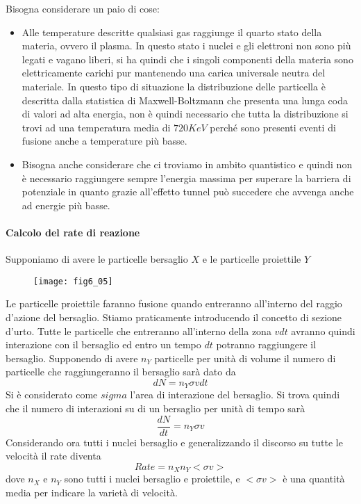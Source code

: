 Bisogna considerare un paio di cose:
\begin{itemize}
\item Alle temperature descritte qualsiasi gas raggiunge il quarto stato della materia, ovvero il plasma.
In questo stato i nuclei e gli elettroni non sono più legati e vagano liberi, si ha quindi che i singoli componenti della materia sono elettricamente carichi pur mantenendo una carica universale neutra del materiale.
In questo tipo di situazione la  distribuzione delle particella è descritta dalla statistica di Maxwell-Boltzmann che presenta una lunga coda di valori ad alta energia, non è quindi necessario che tutta la distribuzione si trovi ad una temperatura media di $720KeV$ perché sono presenti eventi di fusione anche a temperature più basse.
\item Bisogna anche considerare che ci troviamo in ambito quantistico e quindi non è necessario raggiungere sempre l'energia massima per superare la barriera di potenziale in quanto grazie all'effetto tunnel può succedere che avvenga anche ad energie più basse.
\end{itemize}

\paragraph{Calcolo del rate di reazione}
Supponiamo di avere le particelle bersaglio $X$ e le particelle proiettile $Y$
\begin{figure}[h]
\centering
\texttt{[image: fig6\_05]}
\end{figure}

Le particelle proiettile faranno fusione quando entreranno all'interno del raggio d'azione del bersaglio.
Stiamo praticamente introducendo il concetto di  sezione d'urto.
Tutte le particelle che entreranno all'interno della zona $vdt$ avranno quindi interazione con il bersaglio ed entro un tempo $dt$ potranno raggiungere il bersaglio.
Supponendo di avere $n_Y$ particelle per unità di volume il numero di particelle che raggiungeranno il bersaglio sarà dato da
\begin{equation}
dN=n_Y \sigma vdt
\end{equation}
Si è considerato come $sigma$ l'area di interazione del bersaglio.
Si trova quindi che il numero di interazioni su di un bersaglio per unità di tempo sarà 
\begin{equation}
\frac{dN}{dt}=n_Y\sigma v
\end{equation}
Considerando ora tutti i nuclei bersaglio e generalizzando il discorso su tutte le velocità il rate diventa
\begin{equation}
Rate=n_Xn_Y<\sigma v>
\end{equation}
dove $n_X$ e $n_Y$ sono tutti i nuclei bersaglio e proiettile, e $<\sigma v>$ è una quantità media per indicare la varietà di velocità.
 
